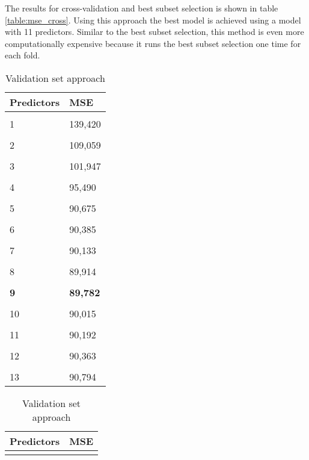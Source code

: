 The results for cross-validation and best subset selection is shown in table \ref{table:mse_cross}. Using this approach the best model is achieved using a model with 11 predictors. Similar to the best subset selection, this method is even more computationally expensive because it runs the best subset selection one time for each fold.

\begin{table}	
	\centering
	\begin{subtable}[t]{2in}
		\centering
		\begin{tabular}{ p{2.5cm} p{1.5cm}  }
			\textbf{Predictors} & \textbf{MSE} \\
			\hline 
			\\
			1 & 139,420 \\\hline
			\\
			2 & 109,059 \\\hline
			\\
			3 & 101,947 \\\hline
			\\
			4 & 95,490  \\\hline
			\\
			5 & 90,675  \\\hline
			\\
			6 & 90,385  \\\hline
			\\
			7 & 90,133  \\\hline
			\\
			8 & 89,914  \\\hline
			\\
			\textbf{9} & \textbf{89,782}  \\\hline
			\\
			10 & 90,015  \\\hline
			\\
			11 & 90,192  \\\hline
			\\
			12 & 90,363  \\\hline
			\\
			13 & 90,794  \\\hline
		\end{tabular}
		\caption{Validation set approach}\label{table:mse_validation}
	\end{subtable}
	\quad 
	\begin{subtable}[t]{2in}
		\centering
	\begin{tabular}{ p{2.5cm} p{1.5cm}  }
		\textbf{Predictors} & \textbf{MSE} \\
		\hline 
		\\

\end{tabular}
\end{subtable}
\end{table}
